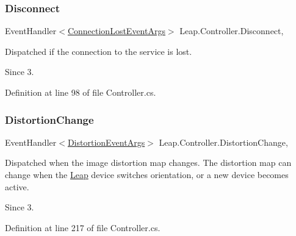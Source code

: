 \mbox{\label{class_leap_1_1_controller_ac627061e99531a03874428bebc5f1111}} 
\subsubsection{\texorpdfstring{Disconnect}{Disconnect}}
{\footnotesize\ttfamily Event\+Handler$<$\mbox{\hyperlink{class_leap_1_1_connection_lost_event_args}{Connection\+Lost\+Event\+Args}}$>$ Leap.\+Controller.\+Disconnect\hspace{0.3cm}{\ttfamily [add]}, {\ttfamily [remove]}}



Dispatched if the connection to the service is lost. 

\begin{DoxySince}{Since}
3. 
\end{DoxySince}


Definition at line 98 of file Controller.\+cs.

\mbox{\label{class_leap_1_1_controller_a3a00d190090f618416c578d8615e4921}} 
\subsubsection{\texorpdfstring{DistortionChange}{DistortionChange}}
{\footnotesize\ttfamily Event\+Handler$<$\mbox{\hyperlink{class_leap_1_1_distortion_event_args}{Distortion\+Event\+Args}}$>$ Leap.\+Controller.\+Distortion\+Change\hspace{0.3cm}{\ttfamily [add]}, {\ttfamily [remove]}}



Dispatched when the image distortion map changes. The distortion map can change when the \mbox{\hyperlink{namespace_leap}{Leap}} device switches orientation, or a new device becomes active. 

\begin{DoxySince}{Since}
3. 
\end{DoxySince}


Definition at line 217 of file Controller.\+cs.

\mbox{\label{class_leap_1_1_controller_ac9829d338d232ab7b09e59fadf2d24c5}} 
